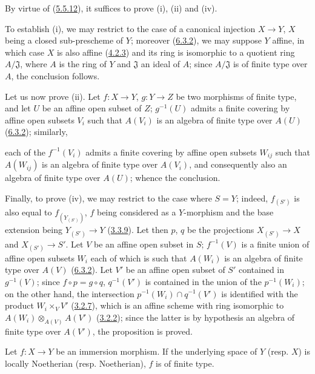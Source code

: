 By virtue of (\hyperref[I.5.5.12]{5.5.12}), it suffices to prove (i),
(ii) and (iv).

To establish (i), we may restrict to the case of a canonical injection
$X\to Y$, $X$ being a closed sub-prescheme of $Y$; moreover
(\hyperref[I.6.3.2]{6.3.2}), we may suppose $Y$ affine, in which case $X$
is also affine (\hyperref[I.4.2.3]{4.2.3}) and its ring is isomorphic to
a quotient ring $A/\mathfrak{J}$, where $A$ is the ring of $Y$ and
$\mathfrak{J}$ an ideal of $A$; since $A/\mathfrak{J}$ is of finite type over
$A$, the conclusion follows.

Let us now prove (ii). Let $f:X\to Y$, $g:Y\to Z$ be two morphisms of
finite type, and let $U$ be an affine open subset of $Z$; $g^{-1}(U)$ admits a
finite covering by affine open subsets $V_i$ such that $A(V_i)$ is an
algebra of finite type over $A(U)$ (\hyperref[I.6.3.2]{6.3.2}); similarly,

each of the $f^{-1}(V_i)$ admits a finite covering by affine open subsets
$W_{ij}$ such that $A(W_{ij})$ is an algebra of finite type over $A(V_i)$, and
consequently also an algebra of finite type over $A(U)$; whence the
conclusion.

Finally, to prove (iv), we may restrict to the case where $S=Y$; indeed,
$f_{(S')}$ is also equal to $f_{(Y_{(S')})}$, $f$ being considered as a
$Y$-morphism and the base extension being $Y_{(S')}\to Y$
(\hyperref[I.3.3.9]{3.3.9}). Let then $p$, $q$ be the projections
$X_{(S')}\to X$ and $X_{(S')}\to S'$. Let $V$ be an affine open subset in
$S$; $f^{-1}(V)$ is a finite union of affine open subsets $W_i$ each of which
is such that $A(W_i)$ is an algebra of finite type over $A(V)$
(\hyperref[I.6.3.2]{6.3.2}). Let $V'$ be an affine open subset of $S'$
contained in $g^{-1}(V)$; since $f\circ p=g\circ q$, $q^{-1}(V')$ is contained
in the union of the $p^{-1}(W_i)$; on the other hand, the intersection
$p^{-1}(W_i)\cap q^{-1}(V')$ is identified with the product $W_i\times_V V'$
(\hyperref[I.3.2.7]{3.2.7}), which is an affine scheme with ring
isomorphic to $A(W_i)\otimes_{A(V)}A(V')$ (\hyperref[I.3.2.2]{3.2.2});
since the latter is by hypothesis an algebra of finite type over $A(V')$, the
proposition is proved.

\begin{corollary}[6.3.5]
\label{I.6.3.5}
Let $f:X\to Y$ be an immersion morphism. If the underlying space of $Y$
(resp. $X$) is locally Noetherian (resp. Noetherian), $f$ is of finite type.
\end{corollary}

